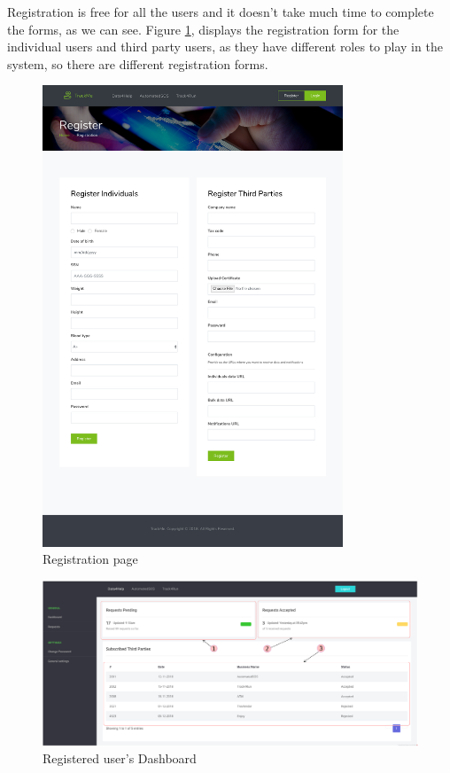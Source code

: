 \documentclass[a4paper, hidelinks, 12pt]{report}
\begin{document}
	Registration is free for all the users and it doesn't take much time to complete the forms, as we can see. Figure \ref{fig:Register}, displays the registration form for the individual users and third party users, as they have different roles to play in the system, so there are different registration forms.\\
	
	\begin{figure}[H]
		\centering
		\includegraphics[width=0.8\textwidth]{Diagrams/ui/d4h_register.png}
		\caption[UI: Registration page]{Registration page}
		\label{fig:Register}
	\end{figure}	
	
	\begin{figure}[H]
		\centering
		\includegraphics[width=1\textwidth]{Diagrams/ui/registered_user_dashboard.png}
		\caption[UI: Registered individual's Dashboard]{Registered user's Dashboard}
		\label{fig:Dashboard_individual}
	\end{figure}
	
\end{document}

